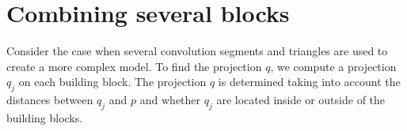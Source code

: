 \documentclass[10pt,journal,a4paper]{IEEEtran}
\begin{document}

\section{Combining several blocks}

Consider the case when several convolution segments and triangles are used to create a more complex model. To find the projection $q$, we compute a projection $q_j$ on each  building block.  The projection $q$ is determined taking into account the distances between $q_j$ and $p$ and whether  $q_j$ are located inside or outside of the building blocks.



 

\end{document}
